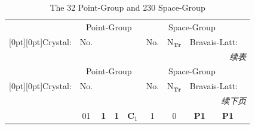 \documentclass{article}      %
\begin{document}
\begin{small}
\begin{longtable}[c]{|c|c|c|c|c|c|c|c|c|}
	\caption{\textrm{The 32 Point-Group and 230 Space-Group}}
\label{tab:Space-Point-Group}\\ %
\hline
%
&\multicolumn{4}{c|}{\textrm{Point-Group}}  &\multicolumn{4}{c|}{\textrm{Space-Group}} \\ \cline{2-9}
\raisebox{2.3ex}[0pt][0pt]{\textrm{Crystal}:} &\textrm{No.}  & \multicolumn{2}{c}{} & &\textrm{No.} &$\mathrm{N}_{\mathbf{Tr}}$ & \multicolumn{2}{c|}{\textrm{Bravais-Latt}:}\\ \hline
\endfirsthead
%
\multicolumn{10}{r}{\it 续表}\\
\hline
&\multicolumn{4}{c|}{\textrm{Point-Group}}  &\multicolumn{4}{c|}{\textrm{Space-Group}} \\ \cline{2-9}
\raisebox{2.3ex}[0pt][0pt]{\textrm{Crystal}:} &\textrm{No.}  &\multicolumn{2}{c}{} & &\textrm{No.} &$\mathrm{N}_{\mathbf{Tr}}$ & \multicolumn{2}{c|}{\textrm{Bravais-Latt}:}\\ \hline
\endhead
%
\multicolumn{10}{r}{\it 续下页}\\
\endfoot
\hline
%
\endlastfoot
%
%
& \textrm{01} &\textbf{1} &\textbf{1} &$\mathbf{C}_1$ &\textrm{1} &0 &\textbf{P1}&\textbf{P1} \\\cline{2-9}

\end{longtable}
\end{small}
\end{document}
